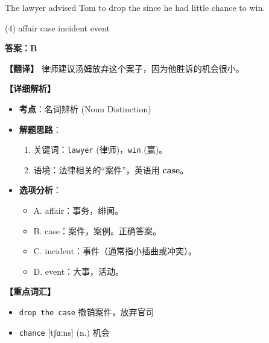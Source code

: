 \documentclass[11pt, a4paper]{article}
\newcommand{\analysis}[4]{
    \begin{solutionbox}
        \textbf{答案：#1}
        
        \textbf{【翻译】} #2
        
        \textbf{【详细解析】}
        #3
        
        \textbf{【重点词汇】}
        #4
    \end{solutionbox}
}
\newcommand{\blank}{\underline{\hspace{1.5cm}}}
\begin{document}
\begin{questions}
    \item The lawyer advised Tom to drop the \blank since he had little chance to win.
    \begin{tasks}(4)
        \task affair \task case \task incident \task event
    \end{tasks}
    \analysis{B}{律师建议汤姆放弃这个案子，因为他胜诉的机会很小。}{
        \begin{itemize}
            \item \textbf{考点}：名词辨析 (Noun Distinction)
            \item \textbf{解题思路}：
                \begin{enumerate}
                    \item 关键词：\texttt{lawyer} (律师)，\texttt{win} (赢)。
                    \item 语境：法律相关的“案件”，英语用 \textbf{case}。
                \end{enumerate}
            \item \textbf{选项分析}：
                \begin{itemize}
                    \item A. affair：事务，绯闻。
                    \item B. case：案件，案例。正确答案。
                    \item C. incident：事件（通常指小插曲或冲突）。
                    \item D. event：大事，活动。
                \end{itemize}
        \end{itemize}
    }{
        \begin{itemize}
            \item \texttt{drop the case} 撤销案件，放弃官司
            \item \texttt{chance} [tʃɑːns] (n.) 机会
        \end{itemize}
    }


\end{questions}
\end{document}
